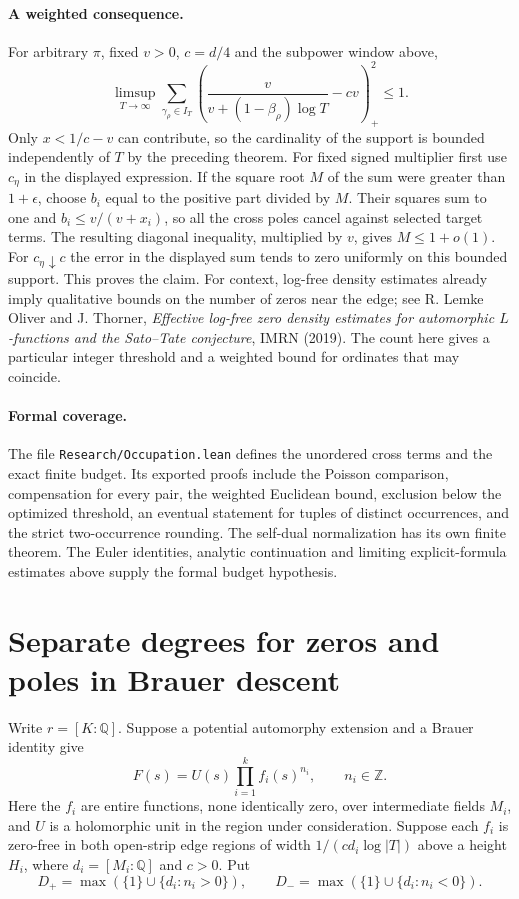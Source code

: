 \documentclass[11pt]{article}
\begin{document}
\paragraph{A weighted consequence.}
For arbitrary $\pi$, fixed $v>0$, $c=d/4$ and the subpower window above,
\[
   \limsup_{T\to\infty}
   \sum_{\gamma_\rho\in I_T}
   \left(\frac{v}{v+(1-\beta_\rho)\log T}-cv\right)_+^2\le1 .
\]
Only $x<1/c-v$ can contribute, so the cardinality of the support is
bounded independently of $T$ by the preceding theorem. For fixed signed
multiplier first use $c_\eta$ in the displayed expression. If the square
root $M$ of the sum were greater than $1+\epsilon$, choose $b_i$ equal
to the positive part divided by $M$. Their squares sum to one and
$b_i\le v/(v+x_i)$, so all the cross poles cancel against selected
target terms. The resulting diagonal inequality, multiplied by $v$,
gives $M\le1+o(1)$. For $c_\eta\downarrow c$ the error in the displayed
sum tends to zero uniformly on this bounded support. This proves the
claim. For context, log-free density estimates already imply qualitative
bounds on the number of zeros near the edge; see R. Lemke Oliver and
J. Thorner, \emph{Effective log-free zero density estimates for automorphic
$L$-functions and the Sato--Tate conjecture}, IMRN (2019).
The count here gives a particular integer threshold and a weighted bound
for ordinates that may coincide.

\paragraph{Formal coverage.}
The file \texttt{Research/Occupation.lean} defines the unordered cross
terms and the exact finite budget. Its exported proofs include the
Poisson comparison, compensation for every pair, the weighted Euclidean
bound, exclusion below the optimized threshold, an eventual statement
for tuples of distinct occurrences, and the strict two-occurrence
rounding. The self-dual normalization has its own finite theorem. The
Euler identities, analytic continuation and limiting explicit-formula
estimates above supply the formal budget hypothesis.


\section{Separate degrees for zeros and poles in Brauer descent}
Write $r=[K:\mathbb Q]$. Suppose a potential automorphy extension and a Brauer identity give
\[
 F(s)=U(s)\prod_{i=1}^k f_i(s)^{n_i},\qquad n_i\in\mathbb Z.
\]
Here the $f_i$ are entire functions, none identically zero, over intermediate fields $M_i$, and $U$ is a holomorphic unit in the region under consideration. Suppose each $f_i$ is zero-free in both open-strip edge regions of width $1/(c d_i\log|T|)$ above a height $H_i$, where $d_i=[M_i:\mathbb Q]$ and $c>0$. Put
\[
 D_+=\max(\{1\}\cup\{d_i:n_i>0\}),\qquad
 D_-=\max(\{1\}\cup\{d_i:n_i<0\}).
\]
\end{document}
